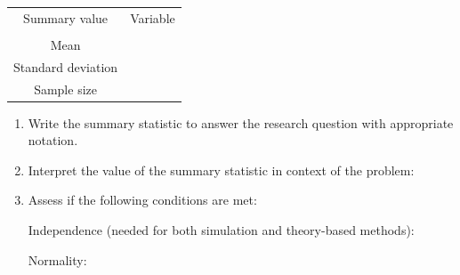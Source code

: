 \documentclass[
]{report}
\begin{document}
\begingroup
\setlength{\tabcolsep}{14pt}
\renewcommand{\arraystretch}{2}
\begin{center}
\begin{tabular}{|c|p{1in}|}
\hline
 Summary value & Variable \\
 & \\ \hline
 Mean &  \\ \hline
 Standard deviation & \\ \hline
 Sample size & \\ \hline
\end{tabular}
\end{center}
\endgroup

\begin{enumerate}
\def\labelenumi{\alph{enumi}.}
\setcounter{enumi}{4}
\item
  Write the summary statistic to answer the research question with appropriate notation.
  \vspace{0.3in}
\item
  Interpret the value of the summary statistic in context of the problem:
  \vspace{0.3in}
\item
  Assess if the following conditions are met:

  Independence (needed for both simulation and theory-based methods):
  \vspace{0.8in}

  Normality:
\end{enumerate}

\vspace{0.8in}
\end{document}
